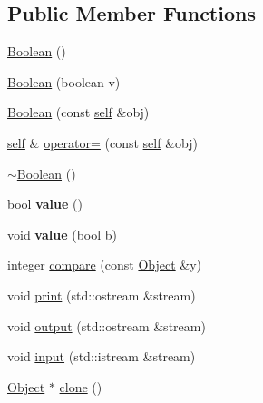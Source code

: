 \subsection*{Public Member Functions}
\begin{DoxyCompactItemize}
\item 
\hyperlink{classez_1_1objects_1_1Boolean_a9eee9d7b6285d1d4aeb28e7b64fba3d1}{Boolean} ()
\item 
\hyperlink{classez_1_1objects_1_1Boolean_a38c5fa82d29626076a027b615ddc64b8}{Boolean} (boolean v)
\item 
\hyperlink{classez_1_1objects_1_1Boolean_a59cf0c39db6caa85a04e26e179523252}{Boolean} (const \hyperlink{classez_1_1objects_1_1Boolean}{self} \&obj)
\item 
\hyperlink{classez_1_1objects_1_1Boolean}{self} \& \hyperlink{classez_1_1objects_1_1Boolean_a4c112c8a5f7e35bd4de19f0b52fa74c7}{operator=} (const \hyperlink{classez_1_1objects_1_1Boolean}{self} \&obj)
\item 
\hyperlink{classez_1_1objects_1_1Boolean_a1650855ce9987132244eb04905f8585b}{$\sim$\+Boolean} ()
\item 
\mbox{\label{classez_1_1objects_1_1Boolean_abf2cb11539f4e11e82c0b3d7fdf05f5c}} 
bool {\bfseries value} ()
\item 
\mbox{\label{classez_1_1objects_1_1Boolean_a2065875fcf73101f468c5023ba56ff96}} 
void {\bfseries value} (bool b)
\item 
integer \hyperlink{classez_1_1objects_1_1Boolean_a6ccc996f98fece5fbe6fd6ebcbd39f4a}{compare} (const \hyperlink{classez_1_1objects_1_1Object}{Object} \&y)
\item 
void \hyperlink{classez_1_1objects_1_1Boolean_aeedca84417b36666eb237d8453b744b6}{print} (std\+::ostream \&stream)
\item 
void \hyperlink{classez_1_1objects_1_1Boolean_a313c385e8ce93e19fd774882143f3a25}{output} (std\+::ostream \&stream)
\item 
void \hyperlink{classez_1_1objects_1_1Boolean_a36f2ae3b2e092b0f6f1d4c0be108e9e3}{input} (std\+::istream \&stream)
\item 
\hyperlink{classez_1_1objects_1_1Object}{Object} $\ast$ \hyperlink{classez_1_1objects_1_1Boolean_a3b1b1775d4869ba005cf4d20623d1260}{clone} ()
\item 
\mbox{\label{classez_1_1objects_1_1Boolean_a197f6db133b2196797226edd6bf1e4e0}} 

\end{DoxyCompactItemize}
